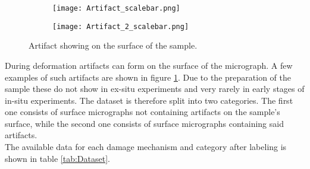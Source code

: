 \begin{figure}[H]
\begin{subfigure}{.5\textwidth}
\centering
  \texttt{[image: Artifact\_scalebar.png]}
\end{subfigure}
\begin{subfigure}{.5\textwidth}
\centering
  \texttt{[image: Artifact\_2\_scalebar.png]}
\end{subfigure}
\caption{Artifact showing on the surface of the sample.}
\label{fig:artifacts}
\end{figure}

During deformation artifacts can form on the surface of the micrograph. A few examples of such artifacts are shown in figure \ref{fig:artifacts}. Due to the preparation of the sample these do not show in ex-situ experiments and very rarely in early stages of in-situ experiments. The dataset is therefore split into two categories. The first one consists of surface micrographs not containing artifacts on the sample's surface, while the second one consists of surface micrographs containing said artifacts. \\

The available data for each damage mechanism and category after labeling is shown in table \ref{tab:Dataset}.



